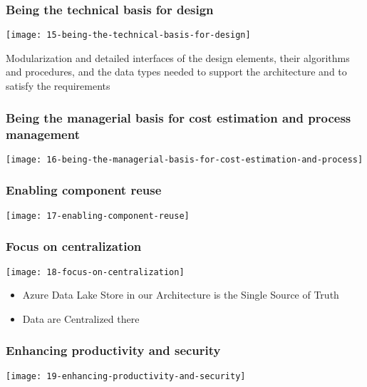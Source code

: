 \subsubsection{Being the technical basis for design}
\begin{center}
\texttt{[image: 15-being-the-technical-basis-for-design]}
\end{center}

Modularization and detailed interfaces of the design elements, their algorithms and procedures, and the data types needed to support the architecture and to satisfy the requirements

\subsubsection{Being the managerial basis for cost estimation and process
management}
\begin{center}
\texttt{[image: 16-being-the-managerial-basis-for-cost-estimation-and-process]}
\end{center}

\subsubsection{Enabling component reuse}
\begin{center}
\texttt{[image: 17-enabling-component-reuse]}
\end{center}

\subsubsection{Focus on centralization}
\begin{center}
\texttt{[image: 18-focus-on-centralization]}
\end{center}

\begin{itemize}
	\item Azure Data Lake Store in our Architecture is the Single Source of Truth
	\item Data are Centralized there
\end{itemize}

\subsubsection{Enhancing productivity and security}
\begin{center}
\texttt{[image: 19-enhancing-productivity-and-security]}
\end{center}

